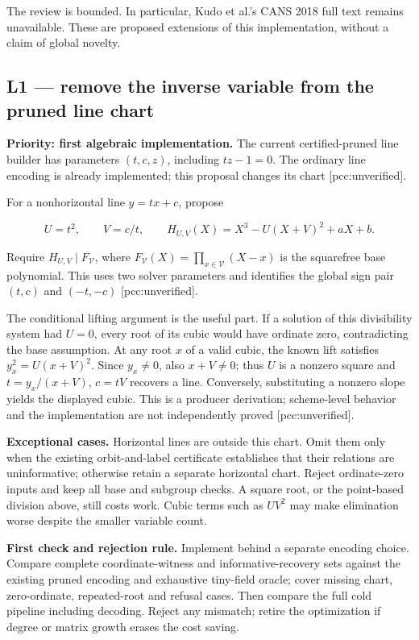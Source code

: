 \documentclass[
  10pt,
]{article}
\begin{document}
The review is bounded. In particular, Kudo et al.'s CANS 2018 full text
remains unavailable. These are proposed extensions of this
implementation, without a claim of global novelty.

\subsection{L1 --- remove the inverse variable from the pruned line
chart}\label{l1-remove-the-inverse-variable-from-the-pruned-line-chart}

\textbf{Priority: first algebraic implementation.} The current
certified-pruned line builder has parameters \((t,c,z)\), including
\(tz-1=0\). The ordinary line encoding is already implemented; this
proposal changes its chart {[}pcc:unverified{]}.

For a nonhorizontal line \(y=tx+c\), propose

\[U=t^2,\qquad V=c/t,\qquad
H_{U,V}(X)=X^3-U(X+V)^2+aX+b.\]

Require \(H_{U,V}\mid F_{\mathcal V}\), where
\(F_{\mathcal V}(X)=\prod_{x\in\mathcal V}(X-x)\) is the squarefree base
polynomial. This uses two solver parameters and identifies the global
sign pair \((t,c)\) and \((-t,-c)\) {[}pcc:unverified{]}.

The conditional lifting argument is the useful part. If a solution of
this divisibility system had \(U=0\), every root of its cubic would have
ordinate zero, contradicting the base assumption. At any root \(x\) of a
valid cubic, the known lift satisfies \(y_x^2=U(x+V)^2\). Since
\(y_x\ne0\), also \(x+V\ne0\); thus \(U\) is a nonzero square and
\(t=y_x/(x+V)\), \(c=tV\) recovers a line. Conversely, substituting a
nonzero slope yields the displayed cubic. This is a producer derivation;
scheme-level behavior and the implementation are not independently
proved {[}pcc:unverified{]}.

\textbf{Exceptional cases.} Horizontal lines are outside this chart.
Omit them only when the existing orbit-and-label certificate establishes
that their relations are uninformative; otherwise retain a separate
horizontal chart. Reject ordinate-zero inputs and keep all base and
subgroup checks. A square root, or the point-based division above, still
costs work. Cubic terms such as \(UV^2\) may make elimination worse
despite the smaller variable count.

\textbf{First check and rejection rule.} Implement behind a separate
encoding choice. Compare complete coordinate-witness and
informative-recovery sets against the existing pruned encoding and
exhaustive tiny-field oracle; cover missing chart, zero-ordinate,
repeated-root and refusal cases. Then compare the full cold pipeline
including decoding. Reject any mismatch; retire the optimization if
degree or matrix growth erases the cost saving.
\end{document}
